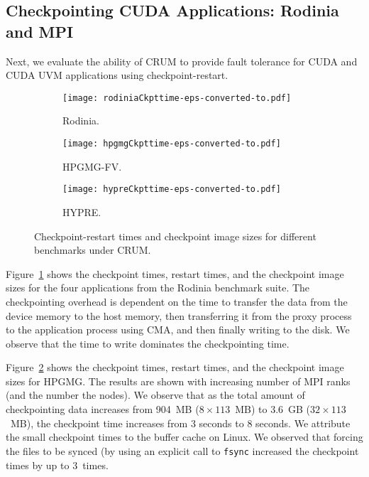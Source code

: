 \documentclass[11pt]{article}
\begin{document}
\subsection{Checkpointing CUDA Applications:  Rodinia and MPI}

Next, we evaluate the ability of CRUM to provide fault tolerance for CUDA and
CUDA UVM applications using checkpoint-restart.

\begin{figure*}[t!]
  \begin{subfigure}[b]{0.32\textwidth}
    \centering
    \texttt{[image: rodiniaCkpttime-eps-converted-to.pdf]}
    \caption{Rodinia. \label{fig:rodiniaCkpttime}}
  \end{subfigure}
  \begin{subfigure}[b]{0.32\textwidth}
    \centering
    \texttt{[image: hpgmgCkpttime-eps-converted-to.pdf]}
    \caption{HPGMG-FV. \label{fig:hpgmgCkpttime}}
  \end{subfigure}
  \begin{subfigure}[b]{0.32\textwidth}
    \centering
    \texttt{[image: hypreCkpttime-eps-converted-to.pdf]}
    \caption{HYPRE. \label{fig:hypreCkpttime}}
  \end{subfigure}
  \caption{Checkpoint-restart times and checkpoint image sizes for different benchmarks under CRUM.}
\end{figure*}


Figure~\ref{fig:rodiniaCkpttime} shows the checkpoint times, restart
times, and the checkpoint image sizes for the four applications from
the Rodinia benchmark suite.
The checkpointing overhead is dependent on the time to transfer the data from
the device memory to the host memory, then transferring it from the proxy process
to the application process using CMA, and then finally writing to the disk.
We observe that the time to write dominates the checkpointing time.


Figure~\ref{fig:hpgmgCkpttime} shows the checkpoint times, restart times, and the
checkpoint image sizes for HPGMG. The results are shown with increasing number
of MPI ranks (and the number the nodes). We observe that as the total amount of
checkpointing data increases from 904~MB ($8 \times 113$~MB) to 3.6~GB ($32
\times 113$~MB), the checkpoint time increases from 3 seconds to 8 seconds. We
attribute the small checkpoint times to the buffer cache on Linux. We observed
that forcing the files to be synced (by using an explicit call to {\tt fsync}
increased the checkpoint times by up to 3~times.
\end{document}
